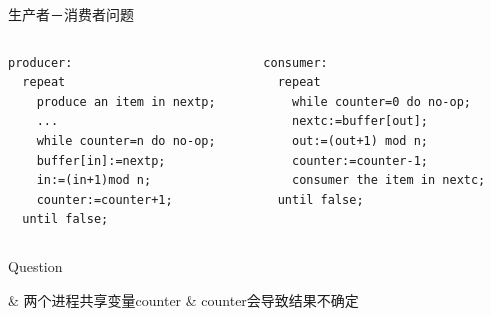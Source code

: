 \begin{frame}[fragile]{生产者－消费者问题}
  \begin{columns}[onlytextwidth,T]
    \begin{column}{0.48\textwidth}
      \begin{verbatim}
producer:
  repeat
    produce an item in nextp;
    ...
    while counter=n do no-op;
    buffer[in]:=nextp;
    in:=(in+1)mod n;
    counter:=counter+1;
  until false; 
\end{verbatim}
    \end{column}
    \begin{column}{0.5\textwidth}
      \begin{verbatim}
consumer:
  repeat
    while counter=0 do no-op;
    nextc:=buffer[out];
    out:=(out+1) mod n;
    counter:=counter-1;
    consumer the item in nextc;
  until false; 
    \end{verbatim}
    \end{column}
  \end{columns}
\end{frame}


\begin{frame}[fragile]{Question}
  \begin{easylist} \easyitem
    & 两个进程共享变量counter
    & counter会导致结果不确定
  \end{easylist}
\end{frame}

